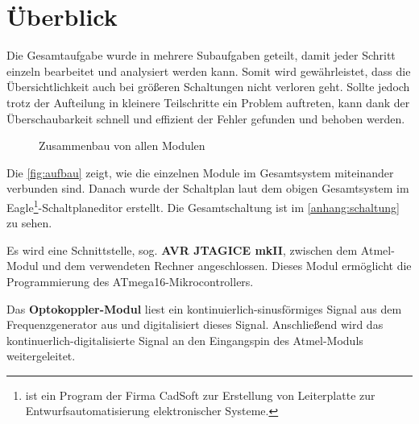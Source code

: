\chapter{Überblick}

Die Gesamtaufgabe wurde in mehrere Subaufgaben geteilt, damit jeder Schritt einzeln bearbeitet und analysiert werden kann. Somit wird gewährleistet, dass die Übersichtlichkeit auch bei größeren Schaltungen nicht verloren geht. Sollte jedoch trotz der Aufteilung in kleinere Teilschritte ein Problem auftreten, kann dank der Überschaubarkeit schnell und effizient der Fehler gefunden und behoben werden. \smallskip \smallskip

\begin{figure}[htbp]
	\centering
	\caption{Zusammenbau von allen Modulen}\label{fig:aufbau}
\end{figure}

Die \autoref{fig:aufbau} zeigt, wie die einzelnen Module im Gesamtsystem miteinander verbunden sind. Danach wurde der Schaltplan laut dem obigen Gesamtsystem im Eagle\footnote{ist ein Program der Firma CadSoft zur Erstellung von Leiterplatte zur Entwurfsautomatisierung elektronischer Systeme.}-Schaltplaneditor \cite{Cadsoft:Eagle} erstellt. Die Gesamtschaltung ist im \autoref{anhang:schaltung} zu sehen. \smallskip \smallskip

Es wird eine Schnittstelle, sog. \textbf{AVR JTAGICE mkII}, zwischen dem Atmel-Modul und dem verwendeten Rechner angeschlossen. Dieses Modul ermöglicht die Programmierung des ATmega16-Mikrocontrollers. \smallskip \smallskip

Das \textbf{Optokoppler-Modul} liest ein kontinuierlich-sinusförmiges Signal aus dem Frequenzgenerator aus und digitalisiert dieses Signal. Anschließend wird das kontinuerlich-digitalisierte Signal an den Eingangspin des Atmel-Moduls weitergeleitet. \smallskip \smallskip

